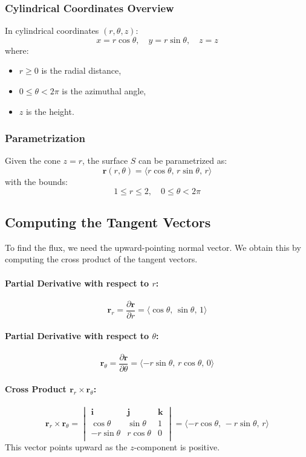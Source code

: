 \documentclass[11pt]{article}
\begin{document}
\subsubsection*{Cylindrical Coordinates Overview}

In cylindrical coordinates \((r, \theta, z)\):
\[
x = r \cos\theta, \quad y = r \sin\theta, \quad z = z
\]
where:
\begin{itemize}
    \item \( r \geq 0 \) is the radial distance,
    \item \( 0 \leq \theta < 2\pi \) is the azimuthal angle,
    \item \( z \) is the height.
\end{itemize}

\subsubsection*{Parametrization}

Given the cone \( z = r \), the surface \( S \) can be parametrized as:
\[
\mathbf{r}(r, \theta) = \langle r \cos\theta, \, r \sin\theta, \, r \rangle
\]
with the bounds:
\[
1 \leq r \leq 2, \quad 0 \leq \theta < 2\pi
\]

\newpage

\subsection{Computing the Tangent Vectors}

To find the flux, we need the upward-pointing normal vector. We obtain this by computing the cross product of the tangent vectors.

\paragraph{Partial Derivative with respect to \( r \):}
\[
\mathbf{r}_r = \frac{\partial \mathbf{r}}{\partial r} = \langle \cos\theta, \, \sin\theta, \, 1 \rangle
\]

\paragraph{Partial Derivative with respect to \( \theta \):}
\[
\mathbf{r}_\theta = \frac{\partial \mathbf{r}}{\partial \theta} = \langle -r \sin\theta, \, r \cos\theta, \, 0 \rangle
\]

\paragraph{Cross Product \( \mathbf{r}_r \times \mathbf{r}_\theta \):}
\[
\mathbf{r}_r \times \mathbf{r}_\theta =
\begin{vmatrix}
\mathbf{i} & \mathbf{j} & \mathbf{k} \\
\cos\theta & \sin\theta & 1 \\
- r \sin\theta & r \cos\theta & 0 \\
\end{vmatrix}
= \langle -r \cos\theta, \, -r \sin\theta, \, r \rangle
\]
This vector points upward as the \( z \)-component is positive.
\end{document}
